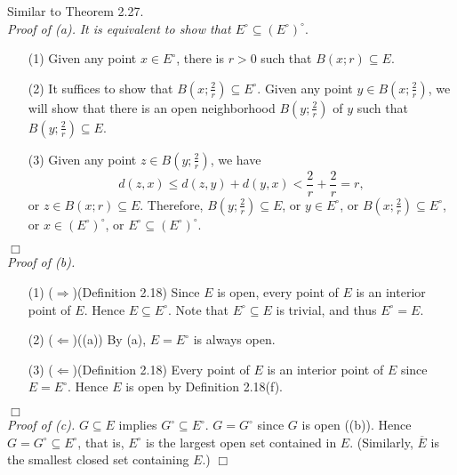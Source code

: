 \documentclass{article}
\begin{document}
Similar to Theorem 2.27. \\

\emph{Proof of (a).}
\emph{It is equivalent to show that
$E^{\circ} \subseteq (E^{\circ})^{\circ}.$}
\begin{enumerate}
\item[(1)]
Given any point $x \in E^{\circ}$, there is $r > 0$ such that $B(x;r) \subseteq E$.
\item[(2)]
It suffices to show that $B\left(x;\frac{2}{r}\right) \subseteq E^{\circ}$.
Given any point $y \in B\left(x;\frac{2}{r}\right)$,
we will show that there is an open neighborhood $B\left(y;\frac{2}{r}\right)$ of $y$
such that $B\left(y;\frac{2}{r}\right) \subseteq E$.
\item[(3)]
Given any point $z \in B\left(y;\frac{2}{r}\right)$, we have
$$d(z,x) \leq d(z,y) + d(y,x) < \frac{2}{r} + \frac{2}{r} = r,$$
or $z \in B(x;r) \subseteq E$.
Therefore, $B\left(y;\frac{2}{r}\right) \subseteq E$,
or $y \in E^{\circ}$,
or $B\left(x;\frac{2}{r}\right) \subseteq E^{\circ}$,
or $x \in (E^{\circ})^{\circ}$,
or $E^{\circ} \subseteq (E^{\circ})^{\circ}$.
\end{enumerate}
$\Box$ \\

\emph{Proof of (b).}
\begin{enumerate}
\item[(1)]
($\Longrightarrow$)(Definition 2.18)
Since $E$ is open, every point of $E$ is an interior point of $E$.
Hence $E \subseteq E^{\circ}$.
Note that $E^{\circ} \subseteq E$ is trivial, and thus $E^\circ = E$.
\item[(2)]
($\Longleftarrow$)((a))
By (a), $E = E^{\circ}$ is always open.
\item[(3)]
($\Longleftarrow$)(Definition 2.18)
Every point of $E$ is an interior point of $E$ since $E = E^\circ$.
Hence $E$ is open by Definition 2.18(f).
\end{enumerate}
$\Box$ \\

\emph{Proof of (c).}
$G \subseteq E$ implies $G^{\circ} \subseteq E^{\circ}$.
$G = G^{\circ}$ since $G$ is open ((b)).
Hence $G = G^{\circ} \subseteq E^{\circ}$, that is,
$E^{\circ}$ is the largest open set contained in $E$.
(Similarly, $\overline{E}$ is the smallest closed set containing $E$.)
$\Box$ \\
\end{document}
